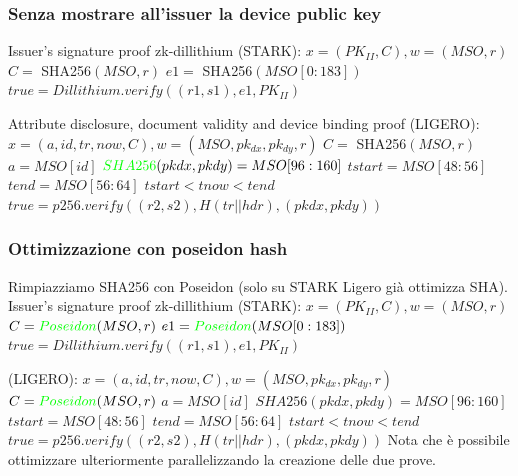 \documentclass{beamer}
\begin{document}
\begin{frame}
\frametitle{Senza mostrare all'issuer la device public key}
Issuer's signature proof zk-dillithium (STARK):\newline
	$x = (PK_{II},C), w = (MSO,r)$\newline
	$C =$ SHA256$(MSO,r)$\newline
	$e1 =$ SHA256$(MSO[0 : 183])$\newline
	$true = Dillithium.verify((r1, s1), e1, PK_{II} )$\newline

Attribute disclosure, document validity and device binding proof (LIGERO):\newline
	$x = (a,id,tr,now,C), w = (MSO,pk_{dx},pk_{dy},r)$\newline
	$C =$ SHA256$(MSO,r)$\newline
	$a = MSO[id]$\newline
	$\textcolor{green}{SHA256}(pkdx, pkdy) = MSO[96 : 160]$\newline
	$tstart = MSO[48 : 56]$\newline
	$tend = MSO[56 : 64]$\newline
	$tstart < tnow < tend$ \newline
	$true = p256.verify((r2, s2), H(tr||hdr), (pkdx, pkdy))$\newline
\end{frame}
\begin{frame}
\frametitle{Ottimizzazione con poseidon hash}
Rimpiazziamo SHA256 con Poseidon (solo su STARK Ligero già ottimizza SHA).
Issuer's signature proof zk-dillithium (STARK):
	$x = (PK_{II},C), w = (MSO,r)$\newline
	$C = \textcolor{green}{Poseidon}(MSO,r)$\newline
	$e1 = \textcolor{green}{Poseidon}(MSO[0 : 183])$\newline
	$true = Dillithium.verify((r1, s1), e1, PK_{II} )$\newline

    (LIGERO):\newline
	$x = (a,id,tr,now,C), w = (MSO,pk_{dx},pk_{dy},r)$\newline
	$C = \textcolor{green}{Poseidon}(MSO,r)$\newline
	$a = MSO[id]$\newline
	$SHA256(pkdx, pkdy) = MSO[96 : 160]$\newline
	$tstart = MSO[48 : 56]$\newline
	$tend = MSO[56 : 64]$\newline
	$tstart < tnow < tend$ \newline
	$true = p256.verify((r2, s2), H(tr||hdr), (pkdx, pkdy))$\newline
Nota che è possibile ottimizzare ulteriormente parallelizzando la creazione delle due prove.
\end{frame}
\end{document}

